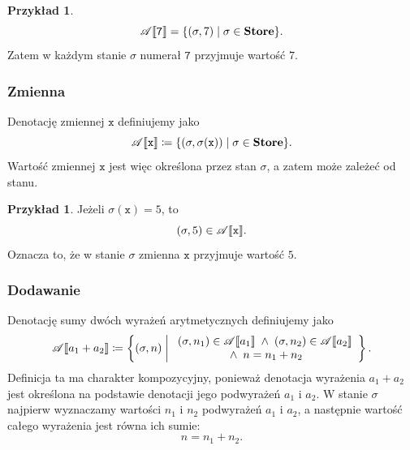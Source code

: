 \documentclass[11pt,a4paper]{article}
\theoremstyle{definition}
\newtheorem{przyklad}[definicja]{Przykład}
\theoremstyle{plain}
\DeclarePairedDelimiter{\semdelim}{\llbracket}{\rrbracket}
\newcommand{\sem}[1]{\semdelim{#1}}
\newcommand{\Aa}{\mathscr{A}}   %
\newcommand{\Store}{\textbf{Store}}
\begin{document}
\begin{przyklad}
	\[
	\Aa\sem{\mathtt{7}}=\{(\sigma,7)\mid \sigma\in\Store\}.
	\]
	Zatem w każdym stanie $\sigma$ numerał $\mathtt{7}$ przyjmuje wartość $7$.
\end{przyklad}

\subsubsection{Zmienna}

Denotację zmiennej $\mathtt{x}$ definiujemy jako
\[
\Aa\sem{\mathtt{x}}\coloneqq \{(\sigma,\sigma(\mathtt{x}))\mid \sigma\in\Store\}.
\]
Wartość zmiennej $\mathtt{x}$ jest więc określona przez stan $\sigma$, a zatem może
zależeć od stanu.

\begin{przyklad}
	Jeżeli $\sigma(\mathtt{x})=5$, to
	\[
	(\sigma,5)\in\Aa\sem{\mathtt{x}}.
	\]
	Oznacza to, że w stanie $\sigma$ zmienna $\mathtt{x}$ przyjmuje wartość $5$.
\end{przyklad}

\subsubsection{Dodawanie}

Denotację sumy dwóch wyrażeń arytmetycznych definiujemy jako
\[
\Aa\sem{a_1+a_2}
\coloneqq 
\left\{
(\sigma,n)
\;\middle|\;
\begin{array}{c}
	(\sigma,n_1)\in\Aa\sem{a_1}
	\;\wedge\;
	(\sigma,n_2)\in\Aa\sem{a_2}\\
	{}\wedge\; n=n_1+n_2
\end{array}
\right\}.
\]
Definicja ta ma charakter kompozycyjny, ponieważ denotacja wyrażenia
$a_1+a_2$ jest określona na podstawie denotacji jego podwyrażeń $a_1$
i $a_2$. W stanie $\sigma$ najpierw wyznaczamy wartości $n_1$ i $n_2$
podwyrażeń $a_1$ i $a_2$, a następnie wartość całego wyrażenia jest równa
ich sumie:
\[
n=n_1+n_2.
\]
\end{document}
